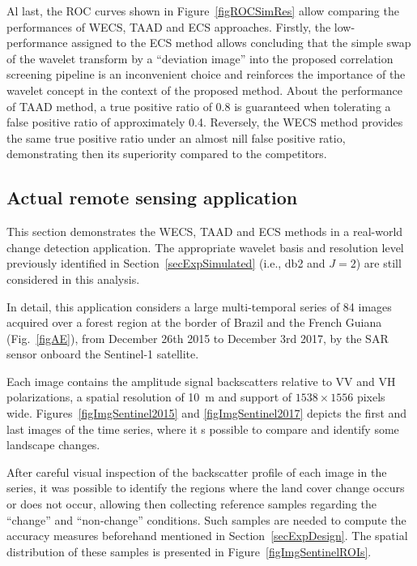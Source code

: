 \documentclass[journal]{IEEEtran}
\begin{document}
Al last, the ROC curves shown in Figure~\ref{figROCSimRes} allow comparing the performances of WECS, TAAD and ECS approaches. 
Firstly, the low-performance assigned to the ECS method allows concluding that the simple swap of the wavelet transform by a ``deviation image'' into the proposed correlation screening pipeline is an inconvenient choice and reinforces the importance of the wavelet concept in the context of the proposed method.
About the performance of TAAD method, a true positive ratio of 0.8 is guaranteed when tolerating a false positive ratio of approximately 0.4. 
Reversely, the WECS method provides the same true positive ratio under an almost nill false positive ratio, demonstrating then its superiority compared to the competitors.


\subsection{Actual remote sensing application}\label{secExpActual}


This section demonstrates the WECS, TAAD and ECS methods in a real-world change detection application. The appropriate wavelet basis and resolution level previously identified in Section~\ref{secExpSimulated} (i.e., db2 and $J=2$) are still considered in this analysis.

In detail, this application considers a large multi-temporal series of 84 images acquired over a forest region at the border of Brazil and the French Guiana (Fig.~\ref{figAE}), from December 26th 2015 to December 3rd 2017, by the SAR sensor onboard the Sentinel-1 satellite.


Each image contains the amplitude signal backscatters relative to VV and VH polarizations, a spatial resolution of \SI{10}{\meter} and support of $1538 \times 1556$ pixels wide.
Figures~\ref{figImgSentinel2015} and \ref{figImgSentinel2017} depicts the first and last images of the time series, where it s possible to compare and identify some landscape changes.

After careful visual inspection of the backscatter profile of each image in the series, it was possible to identify the regions where the land cover change occurs or does not occur, allowing then collecting reference samples regarding the ``change'' and ``non-change'' conditions. 
Such samples are needed to compute the accuracy measures beforehand mentioned in Section~\ref{secExpDesign}. The spatial distribution of these samples is presented in Figure~\ref{figImgSentinelROIs}.
\end{document}
